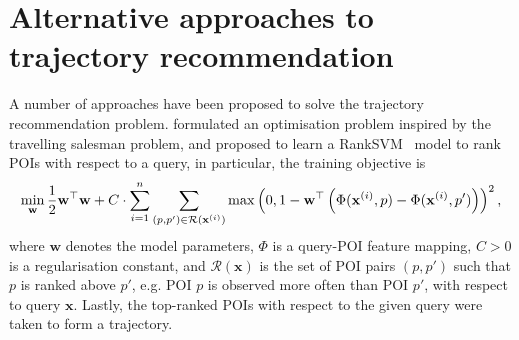 \appendix

\section{Alternative approaches to trajectory recommendation}
\label{sec:alternative}

A number of approaches have been proposed to solve the trajectory recommendation problem.
\citet{ijcai15} formulated an optimisation problem inspired by the travelling salesman problem,
and \citet{cikm16paper} proposed to learn a RankSVM~\cite{lranksvm} model to rank POIs with respect to a query,
in particular, 
the training objective is
\begin{equation*}
\resizebox{\linewidth}{!}{$\displaystyle
\min_{\mathbf{w}} \frac{1}{2} \mathbf{w}^\top \mathbf{w} + C \cdot \sum_{i=1}^n \sum_{(p,p') \in \mathcal{R}(\mathbf{x}^{(i)})}
          \max\left(0, 1 - \mathbf{w}^\top \left(\Phi(\mathbf{x}^{(i)}, p) - \Phi(\mathbf{x}^{(i)}, p') \right) \right)^2,
$}
\end{equation*}
where $\mathbf{w}$ denotes the model parameters, $\Phi$ is a query-POI feature mapping, $C > 0$ is a regularisation constant,
and $\mathcal{R}(\mathbf{x})$ is the set of POI pairs $(p, p')$ such that $p$ is ranked above $p'$,
e.g. POI $p$ is observed more often than POI $p'$, with respect to query $\mathbf{x}$.
Lastly, the top-ranked POIs with respect to the given query were taken to form a trajectory.

